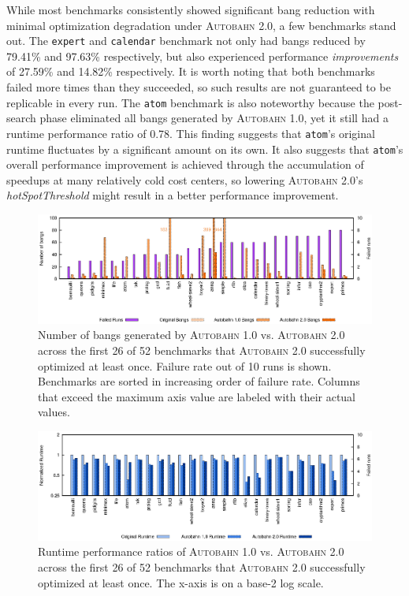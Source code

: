 \documentclass[format=sigplan, review=true, 9pt]{acmart}
\newcommand{\scaption}[1]{\caption{#1}}
\newcommand{\hotspotcost}[0]{\textit{hotSpotThreshold}}
\newcommand{\Ao}[0]{\textsc{Autobahn 1.0}}
\newcommand{\At}[0]{\textsc{Autobahn 2.0}}
\newcommand{\postopt}[0]{post-search}
\begin{document}
While most benchmarks consistently showed significant bang reduction
with minimal optimization degradation under \At{}, a few benchmarks stand
out. The \texttt{expert} and \texttt{calendar} benchmark not only had
bangs reduced by 79.41\% and 97.63\% respectively, but also
experienced performance \textit{improvements} of 27.59\% and 14.82\%
respectively. It is worth noting that both benchmarks failed
more times than they succeeded, so such results are not guaranteed to
be replicable in every run. The \texttt{atom} benchmark is also noteworthy
because the \postopt{} phase eliminated all bangs
generated by \Ao{}, yet it still had a runtime performance ratio of
0.78. This finding suggests that \texttt{atom}'s original
runtime fluctuates by a significant amount on its own. It also
suggests that \texttt{atom}'s overall performance
improvement is achieved through the accumulation of speedups at many
relatively cold cost centers, so lowering \At{}'s \hotspotcost{} 
might result in a better performance improvement.



\begin{figure}
\includegraphics[width=\textwidth]{pap0-bangs}
\scaption{Number of bangs generated by \Ao{} vs. \At{} across the first
26 of 52 benchmarks that \At{} successfully optimized
at least once. Failure
rate out of 10 runs is shown. Benchmarks are sorted in increasing order of
failure rate. Columns that exceed the maximum axis value are labeled
with their actual values.}
\label{fig:2-bangs-26}
\end{figure}

\begin{figure}
\includegraphics[width=\textwidth]{pap0}
\scaption{Runtime performance ratios of \Ao{} vs. \At{} across
the first 26 of 52 benchmarks that \At{} successfully optimized at least
once. The x-axis is on a base-2 log scale.} 
\label{fig:2-ratio-26}
\end{figure}
\end{document}
